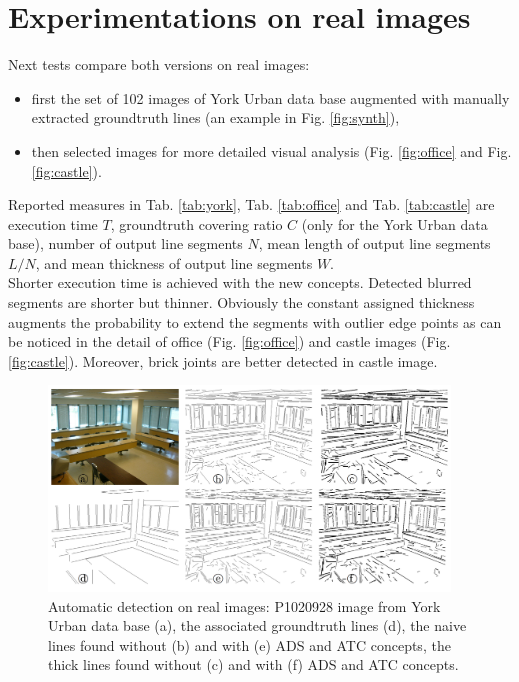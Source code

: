 \documentclass[11pt]{article}
\begin{document}
\pagebreak

\section{Experimentations on real images}

Next tests compare both versions on real images:
\begin{itemize}
\item first the set of 102 images of York Urban data base \cite{Denis08}
augmented with manually extracted groundtruth lines (an example in
Fig. \ref{fig:synth}),
\item then selected images for more detailed visual analysis
(Fig. \ref{fig:office} and Fig. \ref{fig:castle}).
\end{itemize}
Reported measures in Tab. \ref{tab:york}, Tab. \ref{tab:office} and
Tab. \ref{tab:castle}
are execution time $T$, groundtruth covering
ratio $C$ (only for the York Urban data base), number of output line
segments $N$, mean length of output line segments $L/N$, and mean
thickness of output line segments $W$. \\

Shorter execution time is achieved with the new concepts.
Detected blurred segments are shorter but thinner.
Obviously the constant assigned thickness augments the probability to extend
the segments with outlier edge points as can be noticed in the detail of
office (Fig. \ref{fig:office}) and castle images (Fig. \ref{fig:castle}).
Moreover, brick joints are better detected in castle image.

\begin{figure}[h]
  \begin{center}
  \includegraphics[width=0.95\textwidth]{Images/expe0.png}
  \end{center}
  \caption{Automatic detection on real images:
    P1020928 image from York Urban data base \cite{Denis08} (a),
    the associated groundtruth lines (d),
    the naive lines found without (b) and with (e) ADS and ATC concepts,
    the thick lines found without (c) and with (f) ADS and ATC concepts.}
  \label{fig:york}
\end{figure}
\end{document}
